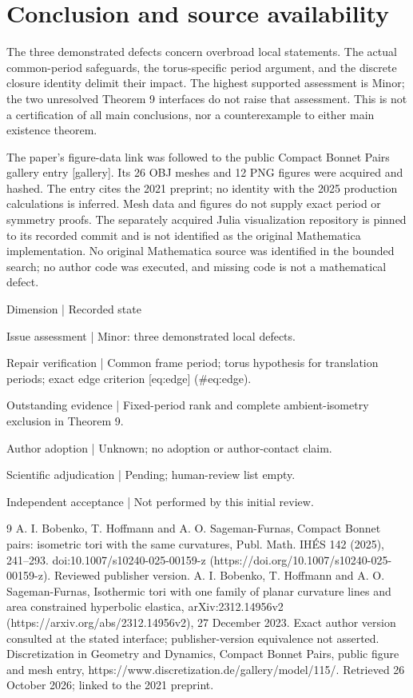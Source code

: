 \documentclass[10pt]{article}
\begin{document}
\section*{Conclusion and source availability}
The three demonstrated defects concern overbroad local statements. The actual common-period safeguards, the torus-specific period argument, and the discrete closure identity delimit their impact. The highest supported assessment is Minor; the two unresolved Theorem 9 interfaces do not raise that assessment. This is not a certification of all main conclusions, nor a counterexample to either main existence theorem.\par
The paper’s figure-data link was followed to the public Compact Bonnet Pairs gallery entry [gallery]. Its 26 OBJ meshes and 12 PNG figures were acquired and hashed. The entry cites the 2021 preprint; no identity with the 2025 production calculations is inferred. Mesh data and figures do not supply exact period or symmetry proofs. The separately acquired Julia visualization repository is pinned to its recorded commit and is not identified as the original Mathematica implementation. No original Mathematica source was identified in the bounded search; no author code was executed, and missing code is not a mathematical defect.\par
Dimension | Recorded state\par
Issue assessment | Minor: three demonstrated local defects.\par
Repair verification | Common frame period; torus hypothesis for translation periods; exact edge criterion [eq:edge] (\#eq:edge).\par
Outstanding evidence | Fixed-period rank and complete ambient-isometry exclusion in Theorem 9.\par
Author adoption | Unknown; no adoption or author-contact claim.\par
Scientific adjudication | Pending; human-review list empty.\par
Independent acceptance | Not performed by this initial review.\par
9 A. I. Bobenko, T. Hoffmann and A. O. Sageman-Furnas, Compact Bonnet pairs: isometric tori with the same curvatures, Publ. Math. IHÉS 142 (2025), 241–293. doi:10.1007/s10240-025-00159-z (https://doi.org/10.1007/s10240-025-00159-z). Reviewed publisher version. A. I. Bobenko, T. Hoffmann and A. O. Sageman-Furnas, Isothermic tori with one family of planar curvature lines and area constrained hyperbolic elastica, arXiv:2312.14956v2 (https://arxiv.org/abs/2312.14956v2), 27 December 2023. Exact author version consulted at the stated interface; publisher-version equivalence not asserted. Discretization in Geometry and Dynamics, Compact Bonnet Pairs, public figure and mesh entry, https://www.discretization.de/gallery/model/115/. Retrieved 26 October 2026; linked to the 2021 preprint.\par
\end{document}
